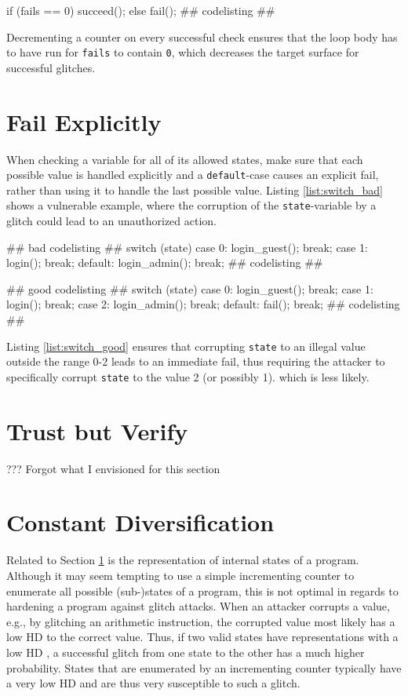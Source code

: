 if (fails == 0)
	succeed();
else
	fail();
\label{list:check_good}
## codelisting ##


Decrementing a counter on every successful check ensures that the loop body has to have run for \texttt{fails} to contain \texttt{0}, which decreases the target surface for successful glitches.

\section{Fail Explicitly}
\label{sec:fail_explicit}

When checking a variable for all of its allowed states, make sure that each possible value is handled explicitly and a \texttt{default}-case causes an explicit fail, rather than using it to handle the last possible value. Listing \ref{list:switch_bad} shows a vulnerable example, where the corruption of the \texttt{state}-variable by a glitch could lead to an unauthorized action.

## bad codelisting ##
switch (state) {
	case 0: login_guest(); break;
	case 1: login(); break;
	default: login_admin(); break;
}
\label{list:switch_bad}
## codelisting ##

## good codelisting ##
switch (state) {
	case 0: login_guest(); break;
	case 1: login(); break;
	case 2: login_admin(); break;
	default: fail(); break;
}
\label{list:switch_good}
## codelisting ##

Listing \ref{list:switch_good} ensures that corrupting \texttt{state} to an illegal value outside the range 0-2 leads to an immediate fail, thus requiring the attacker to specifically corrupt \texttt{state} to the value 2 (or possibly 1). which is less likely.\,\cite{witteman2008secure}


\section{Trust but Verify}
??? Forgot what I envisioned for this section
\section{Constant Diversification}
Related to Section \ref{sec:fail_explicit} is the representation of internal states of a program. Although it may seem tempting to use a simple incrementing counter to enumerate all possible (sub-)states of a program, this is not optimal in regards to hardening a program against glitch attacks. When an attacker corrupts a value, e.g., by glitching an arithmetic instruction, the corrupted value most likely has a low HD  to the correct value. Thus, if two valid states have representations with a low HD , a successful glitch from one state to the other has a much higher probability. States that are enumerated by an incrementing counter typically have a very low HD  and are thus very susceptible to such a glitch.\,\cite{witteman2008secure}

